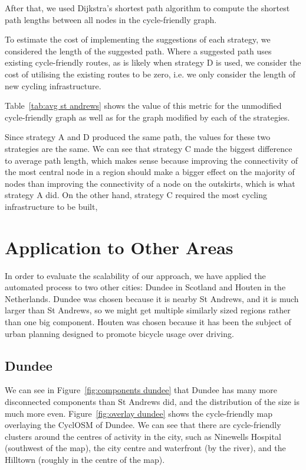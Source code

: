 \documentclass[12pt,a4paper]{report}
\begin{document}
After that, we used Dijkstra's shortest path algorithm to compute the shortest path lengths between all nodes in the cycle-friendly graph.

To estimate the cost of implementing the suggestions of each strategy, we considered the length of the suggested path. Where a suggested path uses existing cycle-friendly routes, as is likely when strategy D is used, we consider the cost of utilising the existing routes to be zero, i.e. we only consider the length of new cycling infrastructure.

Table~\ref{tab:avg st andrews} shows the value of this metric for the unmodified cycle-friendly graph as well as for the graph modified by each of the strategies. 

Since strategy A and D produced the same path, the values for these two strategies are the same. We can see that strategy C made the biggest difference to average path length, which makes sense because improving the connectivity of the most central node in a region should make a bigger effect on the majority of nodes than improving the connectivity of a node on the outskirts, which is what strategy A did. On the other hand, strategy C required the most cycling infrastructure to be built, 

\section{Application to Other Areas}
In order to evaluate the scalability of our approach, we have applied the automated process to two other cities: Dundee in Scotland and Houten in the Netherlands. Dundee was chosen because it is nearby St Andrews, and it is much larger than St Andrews, so we might get multiple similarly sized regions rather than one big component. Houten was chosen because it has been the subject of urban planning designed to promote bicycle usage over driving.

\subsection{Dundee}\label{sec:dundee}
We can see in Figure~\ref{fig:components dundee} that Dundee has many more disconnected components than St Andrews did, and the distribution of the size is much more even. Figure~\ref{fig:overlay dundee} shows the cycle-friendly map overlaying the CyclOSM of Dundee. We can see that there are cycle-friendly clusters around the centres of activity in the city, such as Ninewells Hospital (southwest of the map), the city centre and waterfront (by the river), and the Hilltown (roughly in the centre of the map).
\end{document}
